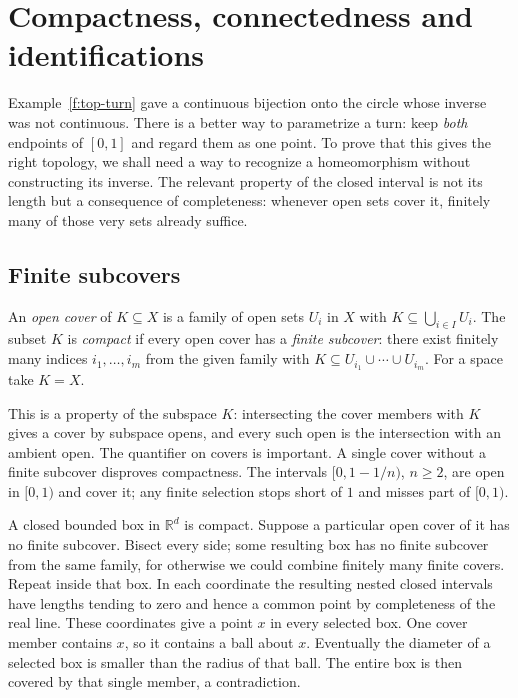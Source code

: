 \chapter{Compactness, connectedness and identifications}\label{f:quotient}

Example~\ref{f:top-turn} gave a continuous bijection onto the circle whose inverse was not continuous. There is a better way to parametrize a turn: keep \emph{both} endpoints of $[0,1]$ and regard them as one point. To prove that this gives the right topology, we shall need a way to recognize a homeomorphism without constructing its inverse. The relevant property of the closed interval is not its length but a consequence of completeness: whenever open sets cover it, finitely many of those very sets already suffice.

\section{Finite subcovers}

\begin{definition}\label{f:q-compact}
An \emph{open cover} of $K\subseteq X$ is a family of open sets $U_i$ in $X$ with $K\subseteq\bigcup_{i\in I}U_i$. The subset $K$ is \emph{compact} if every open cover has a \emph{finite subcover}: there exist finitely many indices $i_1,\ldots,i_m$ from the given family with $K\subseteq U_{i_1}\cup\cdots\cup U_{i_m}$. For a space take $K=X$.
\end{definition}

This is a property of the subspace $K$: intersecting the cover members with $K$ gives a cover by subspace opens, and every such open is the intersection with an ambient open. The quantifier on covers is important. A single cover without a finite subcover disproves compactness. The intervals $[0,1-1/n)$, $n\geq2$, are open in $[0,1)$ and cover it; any finite selection stops short of $1$ and misses part of $[0,1)$.

\begin{example}\label{f:q-box}
A closed bounded box in $\mathbb R^d$ is compact. Suppose a particular open cover of it has no finite subcover. Bisect every side; some resulting box has no finite subcover from the same family, for otherwise we could combine finitely many finite covers. Repeat inside that box. In each coordinate the resulting nested closed intervals have lengths tending to zero and hence a common point by completeness of the real line. These coordinates give a point $x$ in every selected box. One cover member contains $x$, so it contains a ball about $x$. Eventually the diameter of a selected box is smaller than the radius of that ball. The entire box is then covered by that single member, a contradiction.
\end{example}

